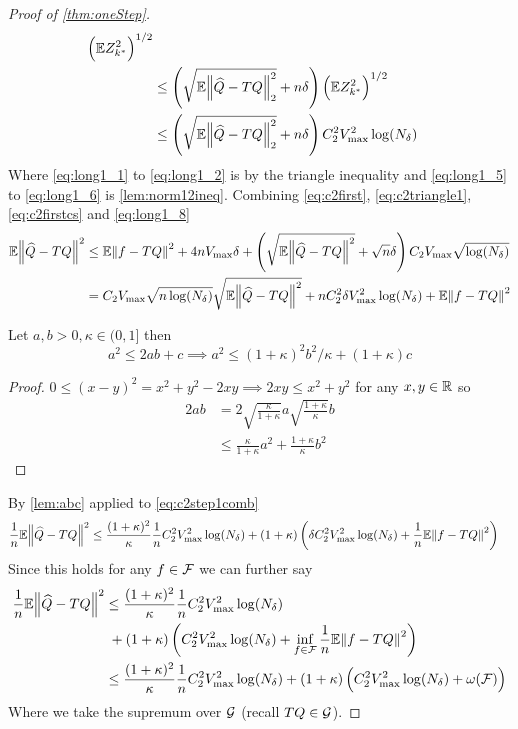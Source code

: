 \begin{proof}[Proof of \cref{thm:oneStep}]
\begin{align}
    \left( \mathbb{E} Z_{k^*}^2 \right)^{1/2} 
    \label{eq:long1_5}
    \\ &\leq 
    \left(\sqrt{ \mathbb{E} \norm{\widehat{Q} -TQ}_2^2 } + n \delta \right) 
    \left( \mathbb{E} Z_{k^*}^2 \right)^{1/2} 
    \label{eq:long1_6}
    \\ &\leq \left(\sqrt{\mathbb{E} \norm{\widehat{Q} -TQ}_2^2} + n \delta \right)
    C_2^2 V_{\max}^2 \log(N_\delta)
    \label{eq:long1_8}
  \end{align}
  Where \cref{eq:long1_1} to \cref{eq:long1_2} is by the triangle inequality
  and \cref{eq:long1_5} to \cref{eq:long1_6} is \cref{lem:norm12ineq}.
  Combining \cref{eq:c2first}, \cref{eq:c2triangle1},
  \cref{eq:c2firstcs} and \cref{eq:long1_8}
  \begin{align}
    \mathbb{E} \norm{\widehat{Q} - TQ}^2 & \leq \mathbb{E} \norm{f - TQ}^2 + 4 n V_{\max} \delta
    + \left( \sqrt{\mathbb{E} \norm{\widehat{Q} - TQ}^2} + \sqrt{n} \delta \right)
    C_2 V_{\max} \sqrt{\log(N_\delta)}
    \\ & = C_2 V_{\max} \sqrt{n \log(N_\delta)} \sqrt{\mathbb{E} \norm{\widehat{Q} - TQ}^2}
    + n C_2^2 \delta V_{\max}^2 \log(N_\delta) + \mathbb{E} \norm{f - TQ}^2
    \label{eq:c2step1comb}
  \end{align}
  \begin{lem} Let $a,b>0, \kappa \in (0,1]$ then
    \[ a^2 \leq 2ab + c \implies a^2 \leq (1 + \kappa)^2 b^2 / \kappa
    + (1 + \kappa) c \]
    \label{lem:abc}
  \end{lem}
  \begin{proof} $0 \leq (x - y)^2 = x^2 + y^2 - 2xy \implies 2xy \leq x^2 + y^2$
    for any $x, y \in \mathbb{R}$ so
    \begin{align*}
      2ab & = 2 \sqrt{\frac{\kappa}{1+\kappa}} a \sqrt{\frac{1+\kappa}{\kappa}} b
      \\ & \leq \frac{\kappa}{1+\kappa} a^2 + \frac{1 + \kappa}{\kappa} b^2
    \end{align*}
  \end{proof}
  By \cref{lem:abc} applied to \cref{eq:c2step1comb}
  \begin{align}
    \frac{1}{n} \mathbb{E} \norm{\widehat{Q} - TQ}^2
    & \leq \frac{(1+\kappa)^2}{\kappa} \frac{1}{n} C_2^2 V_{\max}^2 \log(N_\delta)
    + (1 + \kappa) \left( \delta C_2^2 V_{\max}^2 \log(N_\delta)
    + \frac{1}{n} \mathbb{E} \norm{f - TQ}^2 \right)
    \label{eq:c2step1final0}
  \end{align}
  Since this holds for any $f \in \mathcal{F}$ we can further say
  \begin{align}
    \frac{1}{n} \mathbb{E} \norm{\widehat{Q} - TQ}^2
    & \leq \frac{(1+\kappa)^2}{\kappa} \frac{1}{n}
    C_2^2 V_{\max}^2 \log(N_\delta)
    \\ &\; + (1 + \kappa) \left( C_2^2 V_{\max}^2 \log(N_\delta)
      + \inf_{f \in \mathcal{F}}
    \frac{1}{n} \mathbb{E} \norm{f - TQ}^2 \right)
    \notag
    \\ & \leq \frac{(1+\kappa)^2}{\kappa} \frac{1}{n}
    C_2^2 V_{\max}^2 \log(N_\delta)
    + (1 + \kappa) \left( C_2^2 V_{\max}^2 \log(N_\delta)
    + \omega(\mathcal{F}) \right)
    \label{eq:c2step1final}
  \end{align}
  Where we take the supremum over $\mathcal{G}$ (recall $TQ \in \mathcal{G}$).


\end{proof}
